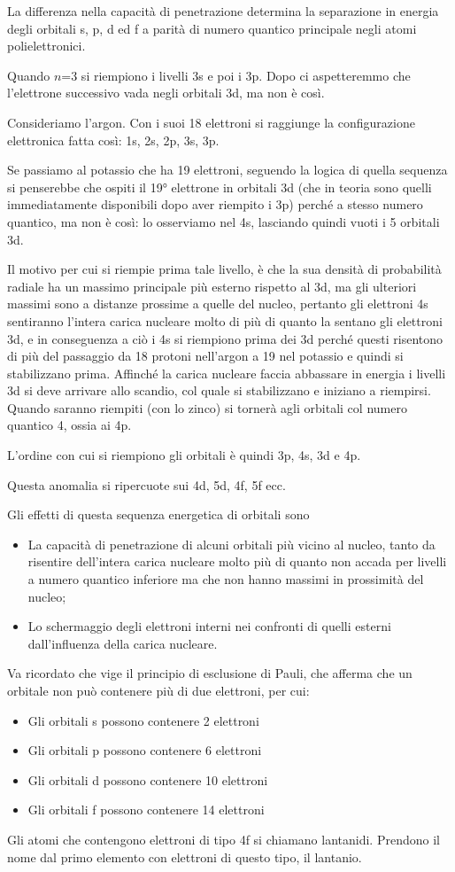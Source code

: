 La differenza nella capacità di penetrazione determina la separazione in energia degli orbitali s, p, d ed f a parità di numero quantico principale negli atomi polielettronici.

Quando $n$=3 si riempiono i livelli 3s e poi i 3p. Dopo ci aspetteremmo che l'elettrone successivo vada negli orbitali 3d, ma non è così.

Consideriamo l'argon. Con i suoi 18 elettroni si raggiunge la configurazione elettronica fatta così: 1s, 2s, 2p, 3s, 3p.

Se passiamo al potassio che ha 19 elettroni, seguendo la logica di quella sequenza si penserebbe che ospiti il 19° elettrone in orbitali 3d (che in teoria sono quelli immediatamente disponibili dopo aver riempito i 3p) perché a stesso numero quantico, ma non è così: lo osserviamo nel 4s, lasciando quindi vuoti i 5 orbitali 3d.

Il motivo per cui si riempie prima tale livello, è che la sua densità di probabilità radiale ha un massimo principale più esterno rispetto al 3d, ma gli ulteriori massimi sono a distanze prossime a quelle del nucleo, pertanto gli elettroni 4s sentiranno l'intera carica nucleare molto di più di quanto la sentano gli elettroni 3d, e in conseguenza a ciò i 4s si riempiono prima dei 3d perché questi risentono di più del passaggio da 18 protoni nell'argon a 19 nel potassio e quindi si stabilizzano prima. Affinché la carica nucleare faccia abbassare in energia i livelli 3d si deve arrivare allo scandio, col quale si stabilizzano e iniziano a riempirsi. Quando saranno riempiti (con lo zinco) si tornerà agli orbitali col numero quantico 4, ossia ai 4p.

L'ordine con cui si riempiono gli orbitali è quindi 3p, 4s, 3d e 4p.

Questa anomalia si ripercuote sui 4d, 5d, 4f, 5f ecc.

Gli effetti di questa sequenza energetica di orbitali sono
\begin{itemize}
  \item La capacità di penetrazione di alcuni orbitali più vicino al nucleo, tanto da risentire dell'intera carica nucleare molto più di quanto non accada per livelli a numero quantico inferiore ma che non hanno massimi in prossimità del nucleo;
  \item Lo schermaggio degli elettroni interni nei confronti di quelli esterni dall'influenza della carica nucleare.
\end{itemize}
Va ricordato che vige il principio di esclusione di Pauli, che afferma che un orbitale non può contenere più di due elettroni, per cui:
\begin{itemize}
  \item Gli orbitali s possono contenere 2 elettroni
  \item Gli orbitali p possono contenere 6 elettroni
  \item Gli orbitali d possono contenere 10 elettroni
  \item Gli orbitali f possono contenere 14 elettroni
\end{itemize}
Gli atomi che contengono elettroni di tipo 4f si chiamano lantanidi. Prendono il nome dal primo elemento con elettroni di questo tipo, il lantanio.

